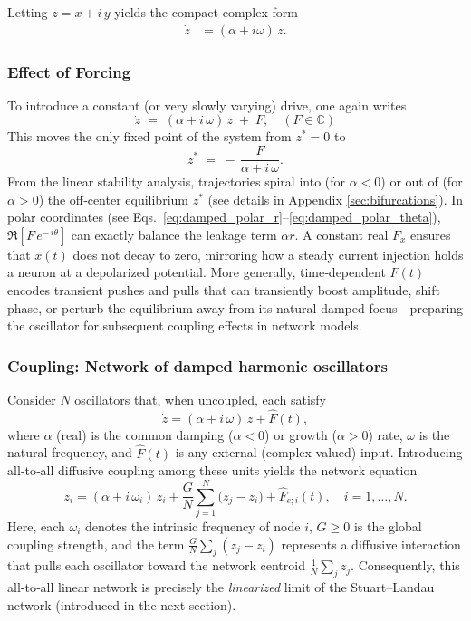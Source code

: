 \documentclass[12pt]{article}
\numberwithin{equation}{section}
\begin{document}
Letting \( z = x + i\,y \) yields the compact complex form
\begin{align}
    \dot{z} &= (\alpha + i\omega)\,z. \label{eq:damped_complex}
\end{align}


\subsubsection{Effect of Forcing}
 To introduce a constant (or very slowly varying) drive, one again writes
\begin{equation}
    \dot z \;=\; (\alpha + i\,\omega)\,z \;+\; F, \quad  (F\in\mathbb{C})
\end{equation}
This moves the only fixed point of the system from \(z^*=0\) to 
\begin{equation}
    z^{*} \;=\; -\,\frac{F}{\alpha + i\,\omega}.
\end{equation}
From the linear stability analysis, trajectories spiral into (for \(\alpha < 0\)) or out of (for \(\alpha>0\)) the off‐center equilibrium \(z^{*}\) (see details in Appendix \ref{sec:bifurcations}).  In polar coordinates (see Eqs.~\eqref{eq:damped_polar_r}–\eqref{eq:damped_polar_theta}), \(\Re[F\,e^{-\,i\theta}]\) can exactly balance the leakage term \(\alpha r\). A constant real \(F_x\) ensures that \(x(t)\) does not decay to zero, mirroring how a steady current injection holds a neuron at a depolarized potential.  More generally, time‐dependent \(F(t)\) encodes transient pushes and pulls that can transiently boost amplitude, shift phase, or perturb the equilibrium away from its natural damped focus—preparing the oscillator for subsequent coupling effects in network models.

 
 
\subsubsection{Coupling: Network of  damped harmonic oscillators}

Consider \(N\) oscillators that, when uncoupled, each satisfy  
\[
    \dot{z} = (\alpha + i\,\omega)\,z + \hat F(t),
\]
where \(\alpha\) (real) is the common damping (\(\alpha<0\)) or growth (\(\alpha>0\)) rate, \(\omega\) is the natural frequency, and \(\hat F(t)\) is any external (complex‐valued) input.  Introducing all‐to‐all diffusive coupling among these units yields the network equation  
\begin{equation}
    \dot{z}_{i} 
    = (\alpha + i\,\omega_{i})\,z_{i} 
    + \frac{G}{N}\sum_{j=1}^{N}\bigl(z_{j} - z_{i}\bigr) 
    +  \hat F_{e;i}(t),
    \quad
    i = 1,\dots, N.
    \label{eq:coupled_linear_damped_complex}
\end{equation}
Here, each \(\omega_{i}\) denotes the intrinsic frequency of node \(i\), \(G\ge0\) is the global coupling strength, and the term \(\tfrac{G}{N}\sum_{j}(z_{j} - z_{i})\) represents a diffusive interaction that pulls each oscillator toward the network centroid \(\tfrac{1}{N}\sum_{j}z_{j}\).    Consequently, this all‐to‐all linear network is precisely the \emph{linearized} limit of the Stuart–Landau network (introduced in the next section).
\end{document}
